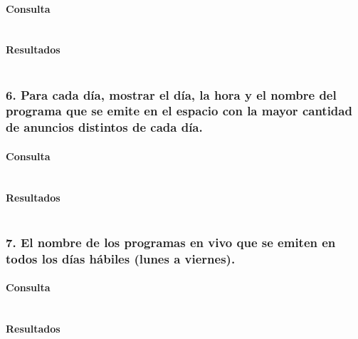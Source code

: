 \paragraph{Consulta}
\begin{verbatim} 

\end{verbatim}

\paragraph{Resultados}
\begin{verbatim} 

\end{verbatim} 

\subsubsection*{6. Para cada d\'ia, mostrar el d\'ia, la hora y el nombre del programa que se emite en el espacio con la mayor cantidad de anuncios distintos de cada d\'ia.}

\paragraph{Consulta}
\begin{verbatim} 

\end{verbatim}

\paragraph{Resultados}
\begin{verbatim} 

\end{verbatim} 

\subsubsection*{7. El nombre de los programas en vivo que se emiten en todos los d\'ias h\'abiles (lunes a viernes).}

\paragraph{Consulta}
\begin{verbatim} 

\end{verbatim}

\paragraph{Resultados}
\begin{verbatim} 

\end{verbatim} 

